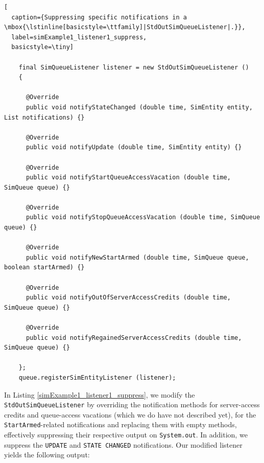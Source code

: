 \documentclass[12pt]{book}
\begin{document}
\begin{lstlisting}[
  caption={Suppressing specific notifications in a \mbox{\lstinline[basicstyle=\ttfamily]|StdOutSimQueueListener|.}},
  label=simExample1_listener1_suppress,
  basicstyle=\tiny]

    final SimQueueListener listener = new StdOutSimQueueListener ()
    {
      
      @Override
      public void notifyStateChanged (double time, SimEntity entity, List notifications) {}

      @Override
      public void notifyUpdate (double time, SimEntity entity) {}
      
      @Override
      public void notifyStartQueueAccessVacation (double time, SimQueue queue) {}

      @Override
      public void notifyStopQueueAccessVacation (double time, SimQueue queue) {}

      @Override
      public void notifyNewStartArmed (double time, SimQueue queue, boolean startArmed) {}
      
      @Override
      public void notifyOutOfServerAccessCredits (double time, SimQueue queue) {}

      @Override
      public void notifyRegainedServerAccessCredits (double time, SimQueue queue) {}

    };
    queue.registerSimEntityListener (listener);

\end{lstlisting}

In Listing \ref{simExample1_listener1_suppress},
  we modify the \lstinline|StdOutSimQueueListener| by overriding
  the notification methods for
  server-access credits
  and queue-access vacations
  (which we do have not described yet),
  for the \lstinline|StartArmed|-related notifications
  and replacing them with empty methods,
  effectively suppressing their respective
  output on \lstinline|System.out|.
In addition,
  we suppress the \lstinline|UPDATE| and \lstinline|STATE CHANGED|
  notifications.
Our modified listener yields the following output:
\end{document}
